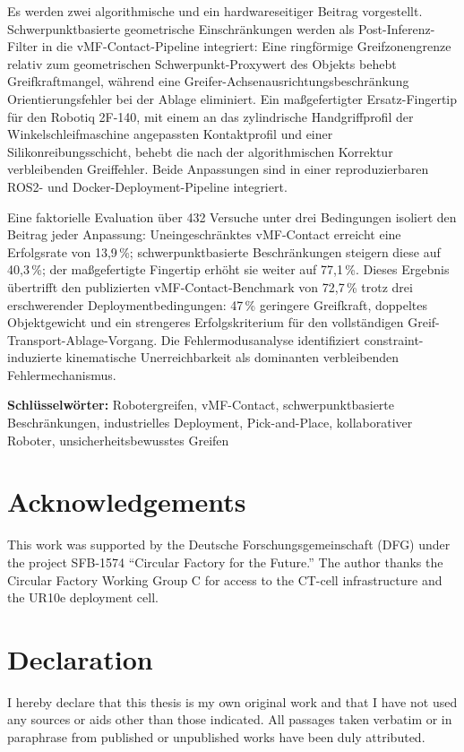 \documentclass[12pt, a4paper]{report}
\begin{document}
Es werden zwei algorithmische und ein hardwareseitiger Beitrag vorgestellt. Schwerpunktbasierte geometrische Einschränkungen werden als Post-Inferenz-Filter in die vMF-Contact-Pipeline integriert: Eine ringförmige Greifzonengrenze relativ zum geometrischen Schwerpunkt-Proxywert des Objekts behebt Greifkraftmangel, während eine Greifer-Achsenausrichtungsbeschränkung Orientierungsfehler bei der Ablage eliminiert. Ein maßgefertigter Ersatz-Fingertip für den Robotiq 2F-140, mit einem an das zylindrische Handgriffprofil der Winkelschleifmaschine angepassten Kontaktprofil und einer Silikonreibungsschicht, behebt die nach der algorithmischen Korrektur verbleibenden Greiffehler. Beide Anpassungen sind in einer reproduzierbaren ROS2- und Docker-Deployment-Pipeline integriert.

Eine faktorielle Evaluation über 432 Versuche unter drei Bedingungen isoliert den Beitrag jeder Anpassung: Uneingeschränktes vMF-Contact erreicht eine Erfolgsrate von 13,9\,\%; schwerpunktbasierte Beschränkungen steigern diese auf 40,3\,\%; der maßgefertigte Fingertip erhöht sie weiter auf 77,1\,\%. Dieses Ergebnis übertrifft den publizierten vMF-Contact-Benchmark von 72,7\,\% trotz drei erschwerender Deploymentbedingungen: 47\,\% geringere Greifkraft, doppeltes Objektgewicht und ein strengeres Erfolgskriterium für den vollständigen Greif-Transport-Ablage-Vorgang. Die Fehlermodusanalyse identifiziert constraint-induzierte kinematische Unerreichbarkeit als dominanten verbleibenden Fehlermechanismus.

\vspace{0.5cm}
\noindent\textbf{Schlüsselwörter:} Robotergreifen, vMF-Contact, schwerpunktbasierte Beschränkungen, industrielles Deployment, Pick-and-Place, kollaborativer Roboter, unsicherheitsbewusstes Greifen

\chapter*{Acknowledgements}
This work was supported by the Deutsche Forschungsgemeinschaft (DFG) under the project SFB-1574 ``Circular Factory for the Future.'' The author thanks the Circular Factory Working Group C for access to the CT-cell infrastructure and the UR10e deployment cell.

\chapter*{Declaration}
I hereby declare that this thesis is my own original work and that I have not used any sources or aids other than those indicated. All passages taken verbatim or in paraphrase from published or unpublished works have been duly attributed.
\end{document}
